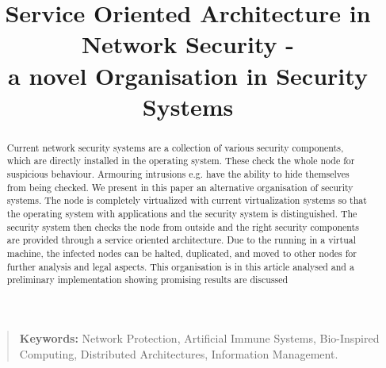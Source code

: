 \documentclass[conference,10pt,a4]{IEEEtran}
\begin{document}
\title{\Large Service Oriented Architecture in Network Security - \\a novel Organisation in Security Systems}


\author{
}


\maketitle

\thispagestyle{plain}

\begin{abstract}
\noindent Current network security systems are a collection of various security components, which are directly installed in the operating system. These check the whole node for suspicious behaviour. Armouring intrusions e.g. have the ability to hide themselves from being checked. We present in this paper an alternative organisation of security systems. The node is completely virtualized with current virtualization systems so that the operating system with applications and the security system is distinguished. The security system then checks the node from outside and the right security components are provided through a service oriented architecture. Due to the running in a virtual machine, the infected nodes can be halted, duplicated, and moved to other nodes for further analysis and legal aspects. This organisation is in this article analysed and a preliminary implementation showing promising results are discussed
\end{abstract}

\begin{quote}
{\small
\textbf{Keywords:} Network Protection, Artificial Immune Systems, Bio-Inspired Computing, Distributed Architectures, Information Management.} 
\end{quote}

\IEEEpeerreviewmaketitle
\end{document}
